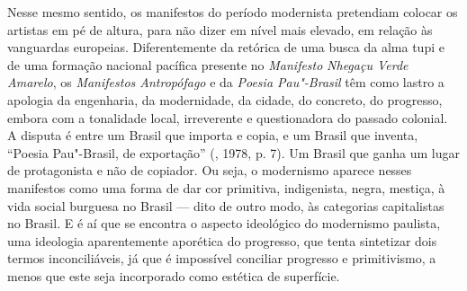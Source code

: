 Nesse mesmo sentido, os manifestos do período modernista pretendiam
colocar os artistas em pé de altura, para não dizer em nível mais
elevado, em relação às vanguardas europeias. Diferentemente da retórica
de uma busca da alma tupi e de uma formação nacional pacífica presente
no \emph{Manifesto} \emph{Nhegaçu Verde Amarelo}, os \emph{Manifestos
Antropófago} e da \emph{Poesia Pau"-Brasil} têm como lastro a apologia da
engenharia, da modernidade, da cidade, do concreto, do progresso, embora
com a tonalidade local, irreverente e questionadora do passado colonial.
A disputa é entre um Brasil que importa e copia, e um Brasil que
inventa, ``Poesia Pau"-Brasil, de exportação'' (, 1978, p. 7). Um
Brasil que ganha um lugar de protagonista e não de copiador. Ou seja, o
modernismo aparece nesses manifestos como uma forma de dar cor
primitiva, indigenista, negra, mestiça, à vida social burguesa no Brasil
--- dito de outro modo, às categorias capitalistas no Brasil. E é aí que
se encontra o aspecto ideológico do modernismo paulista, uma ideologia
aparentemente aporética do progresso, que tenta sintetizar dois termos
inconciliáveis, já que é impossível conciliar progresso e primitivismo,
a menos que este seja incorporado como estética de superfície.

